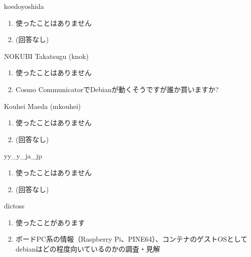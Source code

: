 \begin{prework}{ koedoyoshida }
  \begin{enumerate}
  \item 使ったことはありません
  \item (回答なし)
  \end{enumerate}
\end{prework}

\begin{prework}{ NOKUBI Takatsugu (knok) }
  \begin{enumerate}
  \item 使ったことはありません
  \item Cosmo CommunicatorでDebianが動くそうですが誰か買いますか?
  \end{enumerate}
\end{prework}

\begin{prework}{ Kouhei Maeda (mkouhei) }
  \begin{enumerate}
  \item 使ったことはありません
  \item (回答なし)
  \end{enumerate}
\end{prework}

\begin{prework}{ yy\_y\_ja\_jp }
  \begin{enumerate}
  \item 使ったことはありません
  \item (回答なし)
  \end{enumerate}
\end{prework}

\begin{prework}{ dictoss }
  \begin{enumerate}
  \item 使ったことがあります
  \item ボードPC系の情報（Raspberry Pi、PINE64）、コンテナのゲストOSとしてdebianはどの程度向いているのかの調査・見解
  \end{enumerate}
\end{prework}
